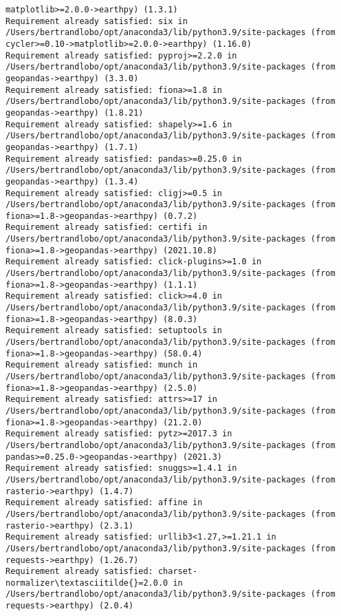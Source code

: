 \documentclass[11pt]{article}
\begin{document}
\begin{Verbatim}[commandchars=\\\{\}]
matplotlib>=2.0.0->earthpy) (1.3.1)
Requirement already satisfied: six in
/Users/bertrandlobo/opt/anaconda3/lib/python3.9/site-packages (from
cycler>=0.10->matplotlib>=2.0.0->earthpy) (1.16.0)
Requirement already satisfied: pyproj>=2.2.0 in
/Users/bertrandlobo/opt/anaconda3/lib/python3.9/site-packages (from
geopandas->earthpy) (3.3.0)
Requirement already satisfied: fiona>=1.8 in
/Users/bertrandlobo/opt/anaconda3/lib/python3.9/site-packages (from
geopandas->earthpy) (1.8.21)
Requirement already satisfied: shapely>=1.6 in
/Users/bertrandlobo/opt/anaconda3/lib/python3.9/site-packages (from
geopandas->earthpy) (1.7.1)
Requirement already satisfied: pandas>=0.25.0 in
/Users/bertrandlobo/opt/anaconda3/lib/python3.9/site-packages (from
geopandas->earthpy) (1.3.4)
Requirement already satisfied: cligj>=0.5 in
/Users/bertrandlobo/opt/anaconda3/lib/python3.9/site-packages (from
fiona>=1.8->geopandas->earthpy) (0.7.2)
Requirement already satisfied: certifi in
/Users/bertrandlobo/opt/anaconda3/lib/python3.9/site-packages (from
fiona>=1.8->geopandas->earthpy) (2021.10.8)
Requirement already satisfied: click-plugins>=1.0 in
/Users/bertrandlobo/opt/anaconda3/lib/python3.9/site-packages (from
fiona>=1.8->geopandas->earthpy) (1.1.1)
Requirement already satisfied: click>=4.0 in
/Users/bertrandlobo/opt/anaconda3/lib/python3.9/site-packages (from
fiona>=1.8->geopandas->earthpy) (8.0.3)
Requirement already satisfied: setuptools in
/Users/bertrandlobo/opt/anaconda3/lib/python3.9/site-packages (from
fiona>=1.8->geopandas->earthpy) (58.0.4)
Requirement already satisfied: munch in
/Users/bertrandlobo/opt/anaconda3/lib/python3.9/site-packages (from
fiona>=1.8->geopandas->earthpy) (2.5.0)
Requirement already satisfied: attrs>=17 in
/Users/bertrandlobo/opt/anaconda3/lib/python3.9/site-packages (from
fiona>=1.8->geopandas->earthpy) (21.2.0)
Requirement already satisfied: pytz>=2017.3 in
/Users/bertrandlobo/opt/anaconda3/lib/python3.9/site-packages (from
pandas>=0.25.0->geopandas->earthpy) (2021.3)
Requirement already satisfied: snuggs>=1.4.1 in
/Users/bertrandlobo/opt/anaconda3/lib/python3.9/site-packages (from
rasterio->earthpy) (1.4.7)
Requirement already satisfied: affine in
/Users/bertrandlobo/opt/anaconda3/lib/python3.9/site-packages (from
rasterio->earthpy) (2.3.1)
Requirement already satisfied: urllib3<1.27,>=1.21.1 in
/Users/bertrandlobo/opt/anaconda3/lib/python3.9/site-packages (from
requests->earthpy) (1.26.7)
Requirement already satisfied: charset-normalizer\textasciitilde{}=2.0.0 in
/Users/bertrandlobo/opt/anaconda3/lib/python3.9/site-packages (from
requests->earthpy) (2.0.4)

\end{Verbatim}
\end{document}
